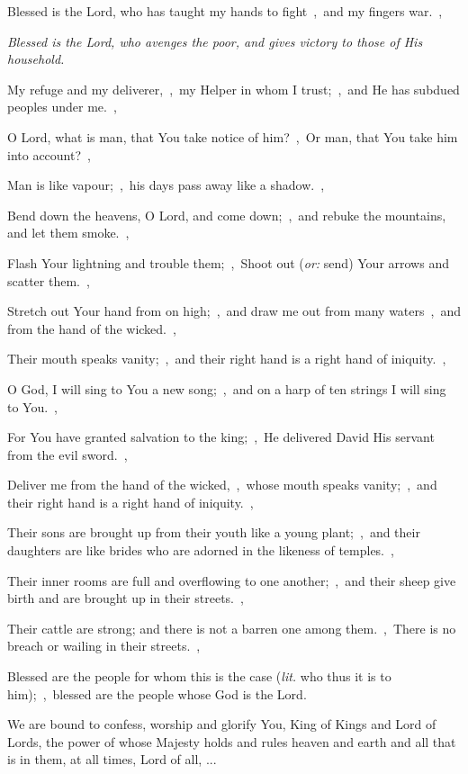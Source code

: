 \documentclass[12pt,twoside,a5paper]{article}
\newcommand{\qanona}[1]{{\liturgicalhint{Qanona.} \emph{#1}}}
\newcommand{\slota}[1]{\liturgicalhint{Slota.} #1}
\newcommand{\translationoption}[1]{\emph{or:} #1}
\newcommand{\translationliteral}[1]{\emph{lit.} #1}
\begin{document}
\begin{normalparskip}
  Blessed is the Lord, who has taught my hands to fight~\sep\ and my fingers war.~\sep

  \qanona{Blessed is the Lord, who avenges the poor, and gives victory to those of His household.}

  My refuge and my deliverer,~\sep\ my Helper in whom I trust;~\sep\ and He has subdued peoples under me.~\sep

  O Lord, what is man, that You take notice of him?~\sep\ Or man, that You take him into account?~\sep

  Man is like vapour;~\sep\ his days pass away like a shadow.~\sep

  Bend down the heavens, O Lord, and come down;~\sep\ and rebuke the mountains, and let them smoke.~\sep

  Flash Your lightning and trouble them;~\sep\ Shoot out (\translationoption{send}) Your arrows and scatter them.~\sep

  Stretch out Your hand from on high;~\sep\ and draw me out from many waters~\sep\ and from the hand of the wicked.~\sep

  Their mouth speaks vanity;~\sep\ and their right hand is a right hand of iniquity.~\sep

  O God, I will sing to You a new song;~\sep\ and on a harp of ten strings I will sing to You.~\sep

  For You have granted salvation to the king;~\sep\ He delivered David His servant from the evil sword.~\sep

  Deliver me from the hand of the wicked,~\sep\ whose mouth speaks vanity;~\sep\ and their right hand is a right hand of iniquity.~\sep

  Their sons are brought up from their youth like a young plant;~\sep\ and their daughters are like brides who are adorned in the likeness of temples.~\sep

  Their inner rooms are full and overflowing to one another;~\sep\ and their sheep give birth and are brought up in their streets.~\sep

  Their cattle are strong; and there is not a barren one among them.~\sep\ There is no breach or wailing in their streets.~\sep

  Blessed are the people for whom this is the case (\translationliteral{who thus it is to him});~\sep\ blessed are the people whose God is the Lord.
\end{normalparskip}

\slota{We are bound to confess, worship and glorify You, King of Kings and Lord of Lords, the power of whose Majesty holds and rules heaven and earth and all that is in them, at all times, Lord of all, ...}
\end{document}
